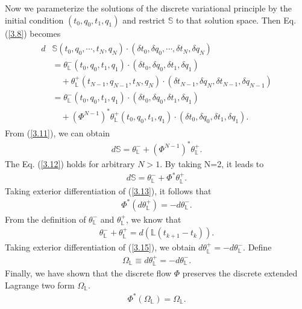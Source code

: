 \documentclass[a4paper,a4paper]{article}
\begin{document}
Now we parameterize the solutions of the discrete variational
principle by the initial condition $(t_{0}, q_{0}, t_{1}, q_{1})$
and  restrict $\mathbb{S}$ to that solution space.  Then Eq.
(\ref{3.8}) becomes
\begin{align}
\begin{split}
 d&\mathbb{S}(t_{0}, q_{0}, \cdots, t_{N}, q_{N})\cdot (\delta t_{0}, \delta q_{0},
      \cdots, \delta t_{N}, \delta q_{N})\\
 &=\theta_{\mathbb{L}}^{-}(t_{0}, q_{0}, t_{1}, q_{1})\cdot
                        (\delta t_{0}, \delta q_{0},  \delta t_{1}, \delta q_{1})\\
   &\quad +\theta_{\mathbb{L}}^{+}(t_{N-1}, q_{N-1}, t_{N}, q_{N})\cdot
                (\delta t_{N-1}, \delta q_{N},  \delta t_{N-1}, \delta q_{N-1})\\
 &=\theta_{\mathbb{L}}^{-}(t_{0}, q_{0}, t_{1}, q_{1})\cdot
                        (\delta t_{0}, \delta q_{0},  \delta t_{1}, \delta q_{1})\\
   &\quad +(\Phi^{N-1})^{*}\theta_{\mathbb{L}}^{+}(t_{0}, q_{0}, t_{1}, q_{1})\cdot
        (\delta t_{0}, \delta q_{0},  \delta t_{1}, \delta q_{1}). \label{3.11}
\end{split}
\end{align}
From (\ref{3.11}), we can obtain
\begin{align}
d\mathbb{S}=\theta_{\mathbb{L}}^{-}+(\Phi^{N-1})^{*}\theta_{\mathbb{L}}^{+}.
\label{3.12}
\end{align}
The Eq. (\ref{3.12}) holds for arbitrary $N>1$. By taking N=2, it
leads to
\begin{align}
d\mathbb{S}=\theta_{\mathbb{L}}^{-}+\Phi^{*}\theta_{\mathbb{L}}^{+}.
\label{3.13}
\end{align}
Taking exterior differentiation of (\ref{3.13}), it follows
that
\begin{align}
  \Phi^{*}(d\theta_{\mathbb{L}}^{+})=-d\theta_{\mathbb{L}}^{-}. \label{3.14}
\end{align}
From the definition of $\theta_{\mathbb{L}}^{-}$ and $\theta_{\mathbb{L}}^{+}$, we
know that
\begin{align}
   \theta_{\mathbb{L}}^{-}+\theta_{\mathbb{L}}^{+}=d(\mathbb{L}(t_{k+1}-t_{k})).\label{3.15}
\end{align}
Taking exterior differentiation of (\ref{3.15}), we obtain
$d\theta_{\mathbb{L}}^{+}=-d\theta_{\mathbb{L}}^{-}$.  Define
\begin{align}
 \Omega_{\mathbb{L}}\equiv d\theta_{\mathbb{L}}^{+}=
-d\theta_{\mathbb{L}}^{-}.\label{3.16}
\end{align}
Finally, we have shown that the discrete flow $\Phi$ preserves the
discrete extended Lagrange two form $\Omega_{\mathbb{L}}$.
\begin{align}
  \Phi^{*}(\Omega_{\mathbb{L}})=\Omega_{\mathbb{L}}. \label{3.17}
\end{align}
\end{document}
